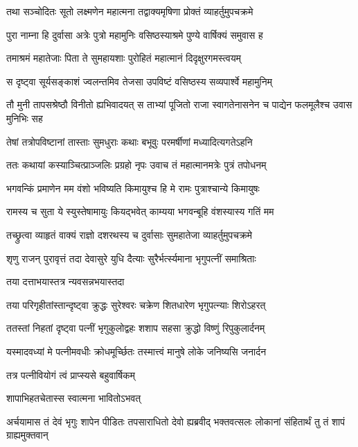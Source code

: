 
\twolineshloka
{तथा सञ्चोदितः सूतो लक्ष्मणेन महात्मना}
{तद्वाक्यमृषिणा प्रोक्तं व्याहर्तुमुपचक्रमे} %

\twolineshloka
{पुरा नाम्ना हि दुर्वासा अत्रेः पुत्रो महामुनिः}
{वसिष्ठस्याश्रमे पुण्ये वार्षिक्यं समुवास ह} %

\twolineshloka
{तमाश्रमं महातेजाः पिता ते सुमहायशाः}
{पुरोहितं महात्मानं दिदृक्षुरगमस्त्वयम्} %

\twolineshloka
{स दृष्ट्वा सूर्यसङ्काशं ज्वलन्तमिव तेजसा}
{उपविष्टं वसिष्ठस्य सव्यपार्श्वे महामुनिम्} %

\twolineshloka
{तौ मुनी तापसश्रेष्ठौ विनीतो ह्यभिवादयत्}
{स ताभ्यां पूजितो राजा स्वागतेनासनेन च पाद्येन फलमूलैश्च उवास मुनिभिः सह} %

\twolineshloka
{तेषां तत्रोपविष्टानां तास्ताः सुमधुराः कथाः}
{बभूवुः परमर्षीणां मध्यादित्यगतेऽहनि} %

\twolineshloka
{ततः कथायां कस्याञ्चित्प्राञ्जलिः प्रग्रहो नृपः}
{उवाच तं महात्मानमत्रेः पुत्रं तपोधनम्} %

\twolineshloka
{भगवन्किं प्रमाणेन मम वंशो भविष्यति}
{किमायुश्च हि मे रामः पुत्राश्चान्ये किमायुषः} %

\twolineshloka
{रामस्य च सुता ये स्युस्तेषामायुः कियद्भवेत्}
{काम्यया भगवन्बूहि वंशस्यास्य गतिं मम} %

\twolineshloka
{तच्छ्रुत्वा व्याहृतं वाक्यं राज्ञो दशरथस्य च}
{दुर्वासाः सुमहातेजा व्याहर्तुमुपचक्रमे} %

\twolineshloka
{शृणु राजन् पुरावृत्तं तदा देवासुरे युधि}
{दैत्याः सुरैर्भर्त्स्यमाना भृगुपत्नीं समाश्रिताः} %

\onelineshloka
{तया दत्ताभयास्तत्र न्यवसन्नभयास्तदा} %

\twolineshloka
{तया परिगृहीतांस्तान्दृष्ट्वा क्रुद्धः सुरेश्वरः}
{चक्रेण शितधारेण भृगुपत्न्याः शिरोऽहरत्} %

\twolineshloka
{ततस्तां निहतां दृष्ट्वा पत्नीं भृगुकुलोद्वहः}
{शशाप सहसा क्रुद्धो विष्णुं रिपुकुलार्दनम्} %

\twolineshloka
{यस्मादवध्यां मे पत्नीमवधीः क्रोधमूर्च्छितः}
{तस्मात्त्वं मानुषे लोके जनिष्यसि जनार्दन} %

\onelineshloka
{तत्र पत्नीवियोगं त्वं प्राप्स्यसे बहुवार्षिकम्} %

\onelineshloka
{शापाभिहतचेतास्स स्वात्मना भावितोऽभवत्} %

\threelineshloka
{अर्चयामास तं देवं भृगुः शापेन पीडितः}
{तपसाराधितो देवो ह्यब्रवीद् भक्तवत्सलः}
{लोकानां संहितार्थं तु तं शापं ग्राह्यमुक्तवान्} %

